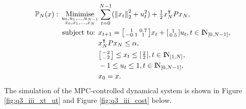 \documentclass[a4paper,11pt,reqno]{amsart}
\newcommand{\N}{{\rm I\!N}}
\newcommand{\tran}{\intercal}
\begin{document}
\begin{subequations}
    \begin{align}
        \mathbb{P}_N(x){}:{}
        \operatorname*{Minimise}_{\substack{u_0,u_1,\ldots,u_{N-1}\\ x_0,x_1,\ldots,x_N}}&\sum_{t=0}^{N-1} (\left\lVert x_t\right\rVert ^2_2+u_t^2) + \tfrac{1}{2}x_N^{\tran}P x_N,
        \\
        \text{subject to: }& x_{t+1} = 
        \begin{bsmallmatrix}
            1&0.7\\
            -0.1&1
        \end{bsmallmatrix}x_t + 
        \begin{bsmallmatrix}
            1\\
            0.5
        \end{bsmallmatrix}u_t, t\in\N_{[0,N-1]},
        \\
        &x_N^{\tran} P x_N \leq \alpha,
        \\
        &\begin{bsmallmatrix}
            -2\\
            -2
        \end{bsmallmatrix} 
        \leq x_t \leq 
        \begin{bsmallmatrix}
            2\\
            2
        \end{bsmallmatrix}, t\in\N_{[1,N]},
        \\
        &-1 \leq u_t \leq 1, t\in\N_{[0,N-1]},
        \\
        & x_0 = x.
    \end{align}
\end{subequations}
The simulation of the MPC-controlled dynamical system is shown in Figure \ref{fig:q3_iii_xt_ut} and Figure \ref{fig:q3_iii_cost} below.
\end{document}
